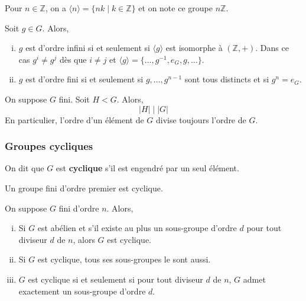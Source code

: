 	\begin{example}
		Pour $n \in \mathbb{Z}$, on a $\langle n \rangle = \{ nk \mid k \in \mathbb{Z} \}$ et on note ce groupe $n\mathbb{Z}$.
	\end{example}
	
	
	\begin{theorem}
		\label{104-1}
		Soit $g \in G$. Alors,
		\begin{enumerate}[(i)]
			\item $g$ est d'ordre infini si et seulement si $\langle g \rangle$ est isomorphe à $(\mathbb{Z}, +)$. Dans ce cas $g^i \neq g^j$ dès que $i \neq j$ et $\langle g \rangle = \{ \dots, g^{-1}, e_G, g, \dots \}$.
			\item \label{104-2} $g$ est d'ordre fini si et seulement si $g, \dots, g^{n-1}$ sont tous distincts et si $g^n = e_G$.
		\end{enumerate}
	\end{theorem}
	
	
	\begin{theorem}[Lagrange]
		On suppose $G$ fini. Soit $H < G$. Alors,
		\[ |H| \mid |G| \]
		En particulier, l'ordre d'un élément de $G$ divise toujours l'ordre de $G$.
	\end{theorem}
	
	\newpage
	\subsubsection{Groupes cycliques}
	
	
	\begin{definition}
		On dit que $G$ est \textbf{cyclique} s'il est engendré par un seul élément.
	\end{definition}
	
	
	\begin{proposition}
		Un groupe fini d'ordre premier est cyclique.
	\end{proposition}
	
	\begin{theorem}
		On suppose $G$ fini d'ordre $n$. Alors,
		\begin{enumerate}[(i)]
			\item Si $G$ est abélien et s'il existe au plus un sous-groupe d'ordre $d$ pour tout diviseur $d$ de $n$, alors $G$ est cyclique.
			\item Si $G$ est cyclique, tous ses sous-groupes le sont aussi.
			\item $G$ est cyclique si et seulement si pour tout diviseur $d$ de $n$, $G$ admet exactement un sous-groupe d'ordre $d$.
		\end{enumerate}
	\end{theorem}
	
